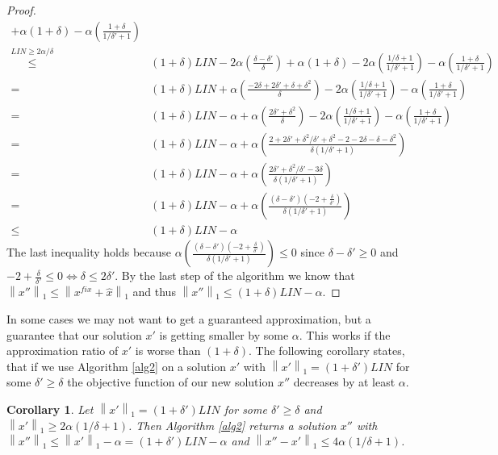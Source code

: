 \documentclass[a4paper,11pt]{article}
\newcommand{\nor}[1]{\left\|#1\right\|}
\newtheorem{cor}[thm]{Corollary}
\begin{document}
\begin{proof}
\begin{align*}
        + \alpha(1+ \delta) 
       - \alpha (\frac{1+ \delta}{1/ \delta'+1}) \\
       \stackrel{\mathit{LIN} \geq 2 \alpha / \delta}{\leq} &(1+ \delta) \mathit{LIN} -
       2 \alpha(\frac{\delta - \delta'}{\delta}) + \alpha(1+ \delta)  -2 \alpha (\frac{1/ \delta +1}{1/ \delta'+1})  
       - \alpha (\frac{1+ \delta}{1/ \delta'+1})\\
       = & (1+ \delta) \mathit{LIN} + 
       \alpha(\frac{-2 \delta + 2 \delta' + \delta + \delta^2}{\delta}) -2 \alpha (\frac{1/ \delta +1}{1/ \delta'+1})  
       - \alpha (\frac{1+ \delta}{1/ \delta'+1})\\
       = & (1+ \delta) \mathit{LIN} - \alpha + \alpha(\frac{2 \delta' + \delta^2}{\delta}) 
       -2 \alpha (\frac{1/ \delta +1}{1/ \delta'+1}) - \alpha (\frac{1+ \delta}{1/ \delta'+1})\\
       = & (1+ \delta) \mathit{LIN} - \alpha 
        +\alpha(\frac{2+ 2\delta' +\delta^2/\delta' + \delta^2 -2 -2\delta - \delta - \delta^2}{\delta(1/ \delta'+1)})\\
       = & (1+ \delta) \mathit{LIN} - \alpha + 
       \alpha(\frac{2\delta' +\delta^2/\delta' -3 \delta}{\delta(1/ \delta'+1)})\\
       = & (1+ \delta) \mathit{LIN} - \alpha + \alpha(\frac{(\delta - \delta') 
       (-2+ \frac{\delta}{\delta'})}{\delta(1/ \delta'+1)})\\
       \leq & (1+ \delta) \mathit{LIN} - \alpha
\end{align*}
The last inequality holds because $\alpha(\frac{(\delta - \delta') (-2+ \frac{\delta}{\delta'})}{\delta(1/ \delta'+1)}) 
\leq 0$ since $\delta - \delta' \geq 0$ and $-2+ \frac{\delta}{\delta'} \leq 0 \Leftrightarrow  \delta \leq 2\delta'$.
	By the last step of the algorithm we know that $\nor{x''}_1 \leq  \nor{x^{fix} + \hat{x}}_1$ and thus
	$\nor{x''}_1 \leq (1+ \delta)\mathit{LIN} - \alpha$.
\end{proof}
In some cases we may not want to get a guaranteed approximation, but a guarantee that our solution $x'$ is getting
smaller by some $\alpha$. This works if the approximation ratio of $x'$ is worse than $(1+\delta)$. 
The following corollary states, that if we use Algorithm \ref{alg2} on a solution $x'$ with 
$\nor{x'}_1 = (1+ \delta')\mathit{LIN}$ for some $\delta' \geq \delta$ the objective function of our new solution 
$x''$ decreases by at least $\alpha$.
\begin{cor}\label{cor5}
	Let $\nor{x'}_1 = (1+ \delta')\mathit{LIN}$ for some $\delta' \geq \delta$ and 
	$\nor{x'}_1 \geq 2 \alpha(1/ \delta +1)$. Then Algorithm \ref{alg2} returns a solution
	$x''$ with $\nor{x''}_1 \leq \nor{x'}_1 - \alpha = (1+ \delta')\mathit{LIN} - \alpha$ and 
	$\nor{x''-x'}_1 \leq 4 \alpha (1/ \delta +1)$.
\end{cor}
\end{document}
